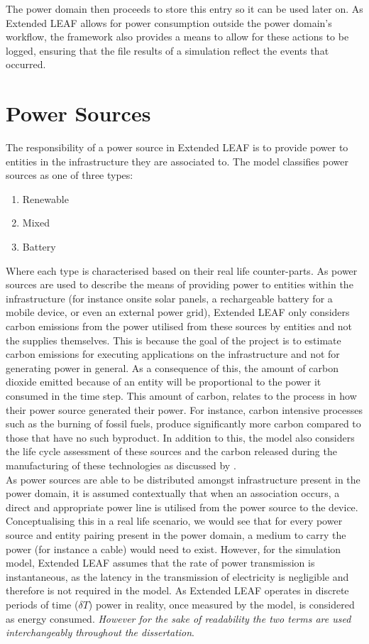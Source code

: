 \documentclass{l4proj}
\begin{document}
The power domain then proceeds to store this entry so it can be used later on.
As Extended LEAF allows for power consumption outside the power domain's workflow, the framework also provides a means to allow for these actions to be logged, ensuring that the file results of a simulation reflect the events that occurred.

\section{Power Sources}
The responsibility of a power source in Extended LEAF is to provide power to entities in the infrastructure they are associated to.
The model classifies power sources as one of three types:
\begin{enumerate}
    \item Renewable
    \item Mixed
    \item Battery
\end{enumerate}
Where each type is characterised based on their real life counter-parts.
As power sources are used to describe the means of providing power to entities within the infrastructure (for instance onsite solar panels, a rechargeable battery for a mobile device, or even an external power grid), Extended LEAF only considers carbon emissions from the power utilised from these sources by entities and not the supplies themselves.
This is because the goal of the project is to estimate carbon emissions for executing applications on the infrastructure and not for generating power in general.
As a consequence of this, the amount of carbon dioxide emitted because of an entity will be proportional to the power it consumed in the time step.
This amount of carbon, relates to the process in how their power source generated their power.
For instance, carbon intensive processes such as the burning of fossil fuels, produce significantly more carbon compared to those that have no such byproduct.
In addition to this, the model also considers the life cycle assessment of these sources and the carbon released during the manufacturing of these technologies as discussed by \cite{PEHNT200655}.\\

As power sources are able to be distributed amongst infrastructure present in the power domain, it is assumed contextually that when an association occurs, a direct and appropriate power line is utilised from the power source to the device.
Conceptualising this in a real life scenario, we would see that for every power source and entity pairing present in the power domain, a medium to carry the power (for instance a cable) would need to exist.
However, for the simulation model, Extended LEAF assumes that the rate of power transmission is instantaneous, as the latency in the transmission of electricity is negligible \citep{speed-of-electricity} and therefore is not required in the model.
As Extended LEAF operates in discrete periods of time ($\delta T$) power in reality, once measured by the model, is considered as energy consumed.
\textit{However for the sake of readability the two terms are used interchangeably throughout the dissertation}.\\
\end{document}
